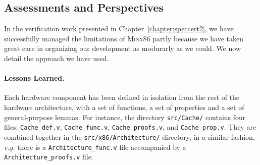 
\subsection{Assessments and Perspectives}
\label{subsec:freespec:approachoverview}

In the verification work presented in Chapter~\ref{chapter:speccert2}, we have
successfully managed the limitations of {\scshape Minx86} partly because we have
taken great care in organizing our development as modurarly as we could.
%
We now detail the approach we have used. 

\paragraph{Lessons Learned.}
%
%
Each hardware component has been defined in isolation from the rest of the
hardware architecture, with a set of functions, a set of properties and a set of
general-purpose lemmas.
%
For instance, the directory \texttt{src/Cache/} contains four files:
\texttt{Cache\_def.v}, \texttt{Cache\_func.v}, \texttt{Cache\_proofs.v}, and
\texttt{Cache\_prop.v}.
%
They are combined together in the \texttt{src/x86/Architecture/} directory, in a
similar fashion, \emph{e.g.} there is a \texttt{Architecture\_func.v} file
accompanied by a \texttt{Architecture\_proofs.v} file. 

